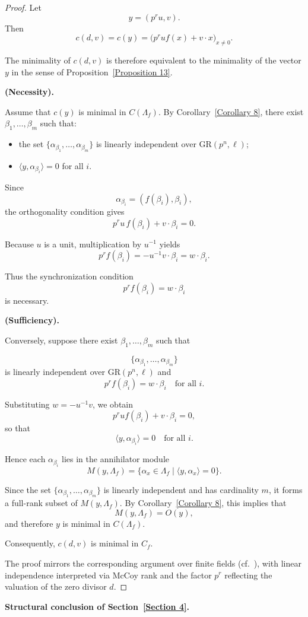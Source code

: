\documentclass[10pt]{article}
\theoremstyle{definition}
\begin{document}
\begin{proof}
Let
\[
y=(p^{r}u,v).
\]
Then
\[
c(d,v)=c(y)
=
\big(p^{r}u f(x)+v\cdot x\big)_{x\neq 0}.
\]

The minimality of $c(d,v)$ is therefore equivalent to the minimality of the vector $y$ in the sense of Proposition~\ref{Proposition 13}.

\medskip
\noindent
\textbf{(Necessity).}

Assume that $c(y)$ is minimal in $C(\Lambda_f)$.
By Corollary~\ref{Corollary 8}, there exist
$\beta_1,\dots,\beta_m$ such that:

\begin{itemize}
\item the set
      $\{\alpha_{\beta_1},\dots,\alpha_{\beta_m}\}$
      is linearly independent over $\mathrm{GR}(p^{n},\ell)$;
\item $\langle y,\alpha_{\beta_i}\rangle = 0$
      for all $i$.
\end{itemize}

Since
\[
\alpha_{\beta_i}=(f(\beta_i),\beta_i),
\]
the orthogonality condition gives
\[
p^{r}u\, f(\beta_i)+v \cdot \beta_i=0.
\]

Because $u$ is a unit, multiplication by $u^{-1}$ yields
\[
p^{r} f(\beta_i)
=
- u^{-1} v \cdot \beta_i
=
w \cdot \beta_i.
\]

Thus the synchronization condition
\[
p^{r} f(\beta_i)= w \cdot \beta_i
\]
is necessary.

\medskip
\noindent
\textbf{(Sufficiency).}

Conversely, suppose there exist
$\beta_1,\dots,\beta_m$ such that

\[
\{\alpha_{\beta_1},\dots,\alpha_{\beta_m}\}
\]
is linearly independent over $\mathrm{GR}(p^{n},\ell)$ and
\[
p^{r} f(\beta_i)= w \cdot \beta_i
\quad \text{for all } i.
\]

Substituting $w=-u^{-1}v$, we obtain
\[
p^{r}u f(\beta_i)+v \cdot \beta_i=0,
\]
so that
\[
\langle y,\alpha_{\beta_i}\rangle=0
\quad \text{for all } i.
\]

Hence each $\alpha_{\beta_i}$ lies in the annihilator module
\[
M(y,\Lambda_f)
=
\{\alpha_x\in\Lambda_f \mid \langle y,\alpha_x\rangle=0\}.
\]

Since the set
$\{\alpha_{\beta_1},\dots,\alpha_{\beta_m}\}$
is linearly independent and has cardinality $m$,
it forms a full-rank subset of $M(y,\Lambda_f)$.
By Corollary~\ref{Corollary 8}, this implies that
\[
M(y,\Lambda_f)=O(y),
\]
and therefore $y$ is minimal in $C(\Lambda_f)$.

Consequently, $c(d,v)$ is minimal in $C_f$.

\medskip

The proof mirrors the corresponding argument over finite fields
(cf.~\cite{WuLuCao}),
with linear independence interpreted via McCoy rank and
the factor $p^{r}$ reflecting the valuation of the zero divisor $d$.
\end{proof}
\noindent
\textbf{Structural conclusion of Section~\ref{Section 4}.}
\end{document}
